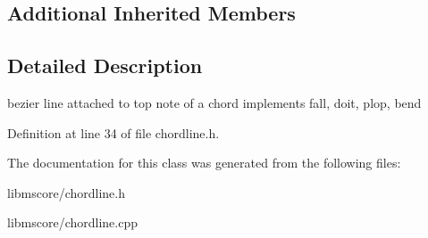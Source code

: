 \subsection*{Additional Inherited Members}


\subsection{Detailed Description}
bezier line attached to top note of a chord implements fall, doit, plop, bend 

Definition at line 34 of file chordline.\+h.



The documentation for this class was generated from the following files\+:\begin{DoxyCompactItemize}
\item 
libmscore/chordline.\+h\item 
libmscore/chordline.\+cpp\end{DoxyCompactItemize}
